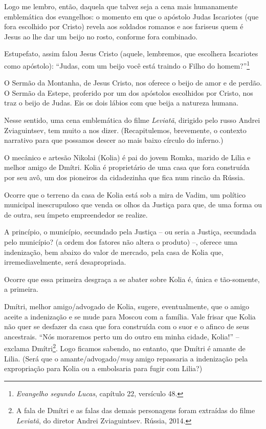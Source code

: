 Logo me lembro, então, daquela que talvez seja a cena mais humanamente
emblemática dos evangelhos: o momento em que o apóstolo Judas Iscariotes
(que fora escolhido por Cristo) revela aos soldados romanos e aos
fariseus quem é Jesus ao lhe dar um beijo no rosto, conforme fora
combinado.

Estupefato, assim falou Jesus Cristo (aquele, lembremos, que escolhera
Iscariotes como apóstolo): ``Judas, com um beijo você está traindo o
Filho do homem?''\footnote{\emph{Evangelho segundo Lucas}, capítulo 22,
  versículo 48.}

O Sermão da Montanha, de Jesus Cristo, nos oferece o beijo de amor e de
perdão. O Sermão da Estepe, proferido por um dos apóstolos escolhidos
por Cristo, nos traz o beijo de Judas. Eis os dois lábios com que beija
a natureza humana.

Nesse sentido, uma cena emblemática do filme \emph{Leviatã}, dirigido
pelo russo Andrei Zviaguintsev, tem muito a nos dizer. (Recapitulemos,
brevemente, o contexto narrativo para que possamos descer ao mais baixo
círculo do inferno.)

O mecânico e artesão Nikolai (Kolia) é pai do jovem Romka, marido de
Lilia e melhor amigo de Dmítri. Kolia é proprietário de uma casa que
fora construída por seu avô, um dos pioneiros da cidadezinha que fica
num rincão da Rússia.

Ocorre que o terreno da casa de Kolia está sob a mira de Vadim, um
político municipal inescrupuloso que venda os olhos da Justiça para que,
de uma forma ou de outra, seu ímpeto empreendedor se realize.

A princípio, o município, secundado pela Justiça -- ou seria a Justiça,
secundada pelo município? (a ordem dos fatores não altera o produto) --,
oferece uma indenização, bem abaixo do valor de mercado, pela casa de
Kolia que, irremediavelmente, será desapropriada.

Ocorre que essa primeira desgraça a se abater sobre Kolia é, única e
tão-somente, a primeira.

Dmítri, melhor amigo/advogado de Kolia, sugere, eventualmente, que o
amigo aceite a indenização e se mude para Moscou com a família. Vale
frisar que Kolia não quer se desfazer da casa que fora construída com o
suor e o afinco de seus ancestrais. ``Nós moraremos perto um do outro em
minha cidade, Kolia!'' -- exclama Dmítri\footnote{A fala de Dmítri e as
  falas das demais personagens foram extraídas do filme \emph{Leviatã},
  do diretor Andrei Zviaguintsev. Rússia, 2014.}. Logo ficamos sabendo,
no entanto, que Dmítri é amante de Lilia. (Será que o
amante/advogado/\emph{muy} amigo repassaria a indenização pela
expropriação para Kolia ou a embolsaria para fugir com Lilia?)

